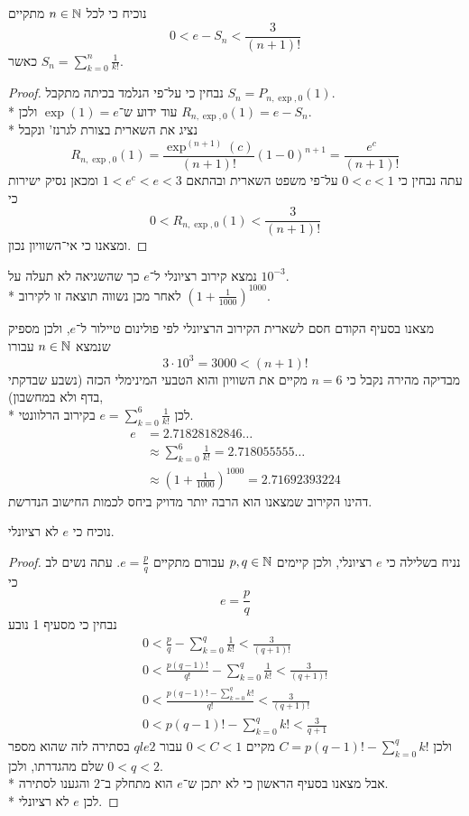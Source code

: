 \Question{}
\Subquestion{}
נוכיח כי לכל $n \in \mathbb{N}$ מתקיים
\[
	0 < e - S_n < \frac{3}{(n + 1)!}
\]
כאשר $S_n = \sum_{k = 0}^{n} \frac{1}{k!}$.
\begin{proof}
	נבחין כי על־פי הנלמד בכיתה מתקבל $S_n = P_{n, \exp, 0}(1)$. \\*
	עוד ידוע ש־$\exp(1) = e$ ולכן $R_{n, \exp, 0}(1) = e - S_n$. \\*
	נציג את השארית בצורת לגרנז' ונקבל
	\[
		R_{n, \exp, 0}(1) = \frac{\exp^{(n + 1)}(c)}{(n + 1)!}{(1 - 0)}^{n + 1}
		= \frac{e^c}{(n + 1)!}
	\]
	עתה נבחין כי $0 < c < 1$ על־פי משפט השארית ובהתאם $1 < e^c < e < 3$ ומכאן נסיק ישירות כי
	\[
		0 < R_{n, \exp, 0}(1) < \frac{3}{(n + 1)!}
	\]
	ומצאנו כי אי־השוויון נכון.
\end{proof}

\Subquestion{}
נמצא קירוב רציונלי ל־$e$ כך שהשגיאה לא תעלה על $10^{-3}$. \\*
לאחר מכן נשווה תוצאה זו לקירוב ${(1 + \frac{1}{1000})}^{1000}$.

מצאנו בסעיף הקודם חסם לשארית הקירוב הרציונלי לפי פולינום טיילור ל־$e$, ולכן מספיק שנמצא $n \in \mathbb{N}$ עבורו
\[
	3 \cdot 10^3 = 3000 < (n + 1)!
\]
מבדיקה מהירה נקבל כי $n = 6$ מקיים את השוויון והוא הטבעי המינימלי הכזה (נשבע שבדקתי בדף ולא במחשבון), \\*
לכן $e = \sum_{k = 0}^{6} \frac{1}{k!}$ בקירוב הרלוונטי.
\begin{align*}
	e & = 2.71828182846\dots \\
	& \approx \sum_{k = 0}^{6} \frac{1}{k!} = 2.718055555\dots \\
	& \approx {(1 + \frac{1}{1000})}^{1000} = 2.71692393224
\end{align*}
דהינו הקירוב שמצאנו הוא הרבה יותר מדויק ביחס לכמות החישוב הנדרשת.

\Subquestion{}
נוכיח כי $e$ לא רציונלי.
\begin{proof}
	נניח בשלילה כי $e$ רציונלי, ולכן קיימים $p, q \in \mathbb{N}$ עבורם מתקיים $e = \frac{p}{q}$.
	עתה נשים לב כי
	\[
		e = \frac{p}{q}
	\]
	נבחין כי מסעיף 1 נובע
	\begin{align*}
		0 < \frac{p}{q} - \sum_{k = 0}^{q} \frac{1}{k!} < \frac{3}{(q + 1)!} \\
		0 < \frac{p(q - 1)!}{q!} - \sum_{k = 0}^{q} \frac{1}{k!} < \frac{3}{(q + 1)!} \\
		0 < \frac{p(q - 1)! - \sum_{k = 0}^{q} k!}{q!} < \frac{3}{(q + 1)!} \\
		0 < p(q - 1)! - \sum_{k = 0}^{q} k! < \frac{3}{q + 1}
	\end{align*}
	ולכן $C = p(q - 1)! - \sum_{k = 0}^{q} k! $ מקיים $0 < C < 1$ עבור $q le 2$ בסתירה לזה שהוא מספר שלם מהגדרתו, ולכן $0 < q < 2$. \\*
	אבל מצאנו בסעיף הראשון כי לא יתכן ש־$e$ הוא מתחלק ב־$2$ והגענו לסתירה. \\*
	לכן $e$ לא רציונלי.
\end{proof}

